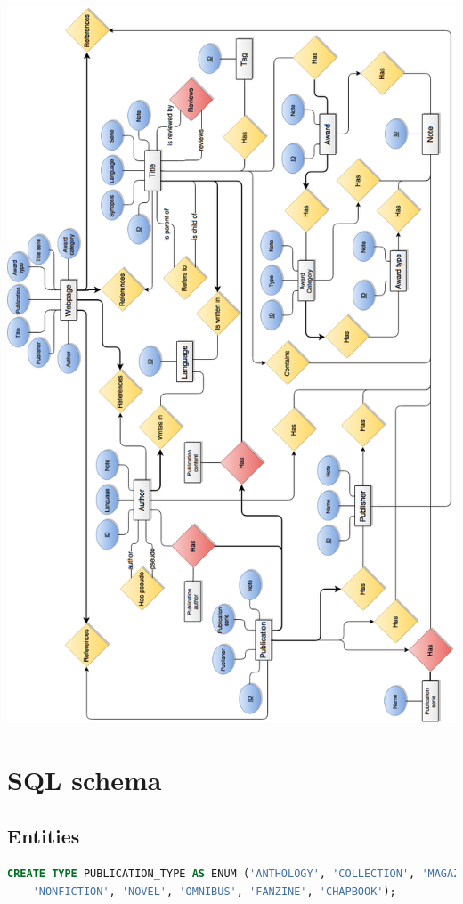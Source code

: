 \documentclass[doubleside, titlepage]{article}
\begin{document}
\newpage

\begin{center}
    \includegraphics[scale = 0.5]{DBMS_ER}
\end{center}

\section{SQL schema}

\subsection{Entities}

\begin{lstlisting}[language=SQL,showspaces=false,basicstyle=\ttfamily,numberstyle=\tiny,commentstyle=\color{gray}
        ]
CREATE TYPE PUBLICATION_TYPE AS ENUM ('ANTHOLOGY', 'COLLECTION', 'MAGAZINE',
	'NONFICTION', 'NOVEL', 'OMNIBUS', 'FANZINE', 'CHAPBOOK');
\end{lstlisting}
\end{document}

